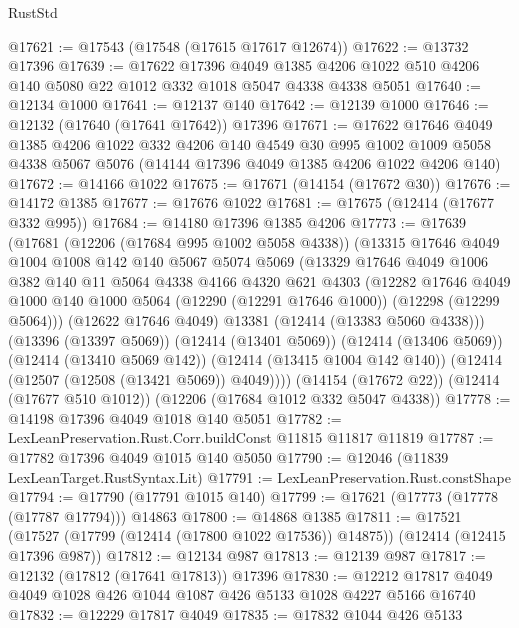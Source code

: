 \begin{lexlean}{RustStd}
\begin{coremodule}
@17621 := @17543 (@17548 (@17615 @17617 @12674))
@17622 := @13732 @17396
@17639 := @17622
    @17396
    @4049
    @1385
    @4206
    @1022
    @510
    @4206
    @140
    @5080
    @22
    @1012
    @332
    @1018
    @5047
    @4338
    @4338
    @5051
@17640 := @12134 @1000
@17641 := @12137 @140
@17642 := @12139 @1000
@17646 := @12132 (@17640 (@17641 @17642)) @17396
@17671 := @17622
    @17646
    @4049
    @1385
    @4206
    @1022
    @332
    @4206
    @140
    @4549
    @30
    @995
    @1002
    @1009
    @5058
    @4338
    @5067
    @5076
    (@14144 @17396 @4049 @1385 @4206 @1022 @4206 @140)
@17672 := @14166 @1022
@17675 := @17671 (@14154 (@17672 @30))
@17676 := @14172 @1385
@17677 := @17676 @1022
@17681 := @17675 (@12414 (@17677 @332 @995))
@17684 := @14180 @17396 @1385 @4206
@17773 := @17639
    (@17681
      (@12206 (@17684 @995 @1002 @5058 @4338))
      (@13315
        @17646
        @4049
        @1004
        @1008
        @142
        @140
        @5067
        @5074
        @5069
        (@13329
          @17646
          @4049
          @1006
          @382
          @140
          @11
          @5064
          @4338
          @4166
          @4320
          @621
          @4303
          (@12282
            @17646
            @4049
            @1000
            @140
            @1000
            @5064
            (@12290 (@12291 @17646 @1000))
            (@12298 (@12299 @5064)))
          (@12622 @17646 @4049)
          @13381
          (@12414 (@13383 @5060 @4338)))
        (@13396 (@13397 @5069))
        (@12414 (@13401 @5069))
        (@12414 (@13406 @5069))
        (@12414 (@13410 @5069 @142))
        (@12414 (@13415 @1004 @142 @140))
        (@12414 (@12507 (@12508 (@13421 @5069)) @4049))))
    (@14154 (@17672 @22))
    (@12414 (@17677 @510 @1012))
    (@12206 (@17684 @1012 @332 @5047 @4338))
@17778 := @14198 @17396 @4049 @1018 @140 @5051
@17782 := LexLeanPreservation.Rust.Corr.buildConst @11815 @11817 @11819
@17787 := @17782 @17396 @4049 @1015 @140 @5050
@17790 := @12046 (@11839 LexLeanTarget.RustSyntax.Lit)
@17791 := LexLeanPreservation.Rust.constShape
@17794 := @17790 (@17791 @1015 @140)
@17799 := @17621 (@17773 (@17778 (@17787 @17794))) @14863
@17800 := @14868 @1385
@17811 := @17521
    (@17527 (@17799 (@12414 (@17800 @1022 @17536)) @14875))
    (@12414 (@12415 @17396 @987))
@17812 := @12134 @987
@17813 := @12139 @987
@17817 := @12132 (@17812 (@17641 @17813)) @17396
@17830 := @12212 @17817 @4049 @4049 @1028 @426 @1044 @1087 @426 @5133 @1028 @4227 @5166 @16740
@17832 := @12229 @17817 @4049
@17835 := @17832 @1044 @426 @5133

\end{coremodule}
\end{lexlean}
